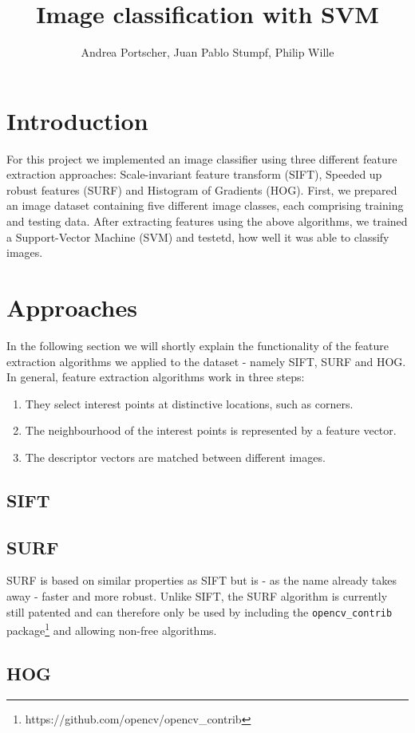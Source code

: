 \documentclass{scrartcl}
\title{Image classification with SVM}
\author{Andrea Portscher, Juan Pablo Stumpf, Philip Wille}
\begin{document}
\maketitle

\section{Introduction}
For this project we implemented an image classifier using three different feature extraction approaches: Scale-invariant feature transform (SIFT), Speeded up robust features (SURF) and Histogram of Gradients (HOG). First, we prepared an image dataset containing five different image classes, each comprising training and testing data. After extracting features using the above algorithms, we trained a Support-Vector Machine (SVM) and testetd, how well it was able to classify images.
\section{Approaches}
In the following section we will shortly explain the functionality of the feature extraction algorithms we applied to the dataset - namely SIFT, SURF and HOG.
In general, feature extraction algorithms work in three steps\cite{bay2006}:
\begin{enumerate}
  \item They select interest points at distinctive locations, such as corners.
  \item The neighbourhood of the interest points is represented by a feature vector.
  \item The descriptor vectors are matched between different images.
\end{enumerate}

\subsection{SIFT}
\subsection{SURF}
SURF is based on similar properties as SIFT but is - as the name already takes away - faster and more robust. Unlike SIFT, the SURF algorithm is currently still patented and can therefore only be used by including the \texttt{opencv\_contrib} package\footnote{https://github.com/opencv/opencv\_contrib} and allowing non-free algorithms.

\subsection{HOG}
\end{document}
